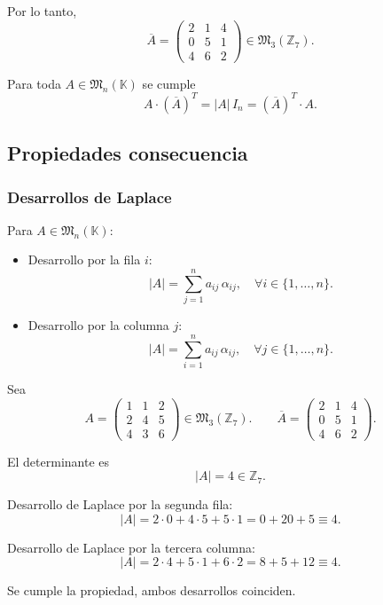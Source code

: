 \documentclass[a4paper,12pt]{article}
\begin{document}
\begin{ejemplo}[title=Ejemplo de cálculo de la matriz adjunta]
Por lo tanto,
\[
\overline{A} =
\begin{pmatrix}
2 & 1 & 4 \\
0 & 5 & 1 \\
4 & 6 & 2
\end{pmatrix} \in \mathfrak{M}_3(\mathbb{Z}_7).
\]
\end{ejemplo}

\begin{procedimiento}[title=Propiedad de la matriz adjunta]
Para toda $A \in \mathfrak{M}_n(\mathbb{K})$ se cumple
\[
A \cdot (\overline{A})^T = |A| \, I_n = (\overline{A})^T \cdot A.
\]
\end{procedimiento}

\subsection{Propiedades consecuencia}

\subsubsection{Desarrollos de Laplace}

\begin{procedimiento}[title=Desarrollos de Laplace]
Para $A \in \mathfrak{M}_n(\mathbb{K})$:
\begin{itemize}
    \item Desarrollo por la fila $i$:
    \[
    |A| = \sum_{j=1}^n a_{ij} \, \alpha_{ij}, \quad \forall i \in \{1,\dots,n\}.
    \]
    \item Desarrollo por la columna $j$:
    \[
    |A| = \sum_{i=1}^n a_{ij} \, \alpha_{ij}, \quad \forall j \in \{1,\dots,n\}.
    \]
\end{itemize}
\end{procedimiento}

\begin{ejemplo}[title=Ejemplo de desarrollos de Laplace]
Sea
\[
A =
\begin{pmatrix}
1 & 1 & 2 \\
2 & 4 & 5 \\
4 & 3 & 6
\end{pmatrix} \in \mathfrak{M}_3(\mathbb{Z}_7). \qquad
\overline{A} =
\begin{pmatrix}
2 & 1 & 4 \\
0 & 5 & 1 \\
4 & 6 & 2
\end{pmatrix}.
\]

El determinante es
\[
|A| = 4 \in \mathbb{Z}_7.
\]

Desarrollo de Laplace por la segunda fila:
\[
|A| = 2\cdot 0 + 4\cdot 5 + 5\cdot 1 = 0 + 20 + 5 \equiv 4.
\]

Desarrollo de Laplace por la tercera columna:
\[
|A| = 2\cdot 4 + 5\cdot 1 + 6\cdot 2 = 8 + 5 + 12 \equiv 4.
\]

Se cumple la propiedad, ambos desarrollos coinciden.
\end{ejemplo}
\end{document}
